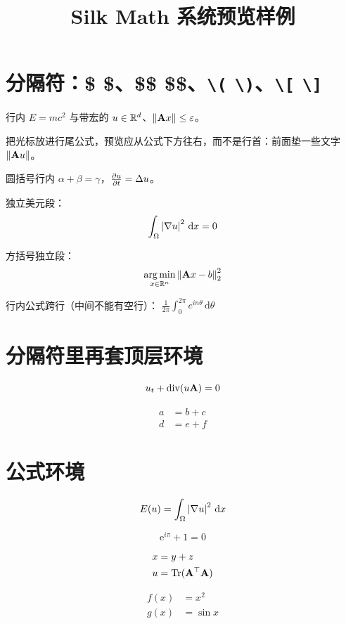 \documentclass{silkmath-fixture}
\title{Silk Math 系统预览样例}
\begin{document}
\section{分隔符：\$ \$、\$\$ \$\$、\verb|\(| \verb|\)|、\verb|\[| \verb|\]|}

行内 $E=mc^2$ 与带宏的 $u\in\mathbb{R}^d$、$\left\lVert \mathbf{A} x \right\rVert\le\varepsilon$。

把光标放进行尾公式，预览应从公式下方往右，而不是行首：前面垫一些文字 $\left\lVert \mathbf{A} u \right\rVert$。

圆括号行内 \(\alpha+\beta=\gamma\)，\(\frac{\partial u}{\partial t}=\Delta u\)。

独立美元段：
$$
\int_\Omega \left\lvert \nabla u \right\rvert^2\,\mathrm{d}x = 0
$$

方括号独立段：
\[
\operatorname*{arg\,min}_{x\in\mathbb{R}^n} \left\lVert \mathbf{A} x-b \right\rVert_2^2
\]

行内公式跨行（中间不能有空行）：
$\frac{1}{2\pi}
\int_0^{2\pi} e^{in\theta}\,\mathrm{d}\theta$

\section{分隔符里再套顶层环境}

$$
\begin{equation}
  u_t + \operatorname{div}(u\A) = 0
\end{equation}
$$

\[
\begin{align}
  a &= b+c \\
  d &= e+f
\end{align}
\]

\section{公式环境}

\begin{equation}
  \label{eq:energy}
  E(u)=\int_\Omega \left\lvert \nabla u \right\rvert^2\,\mathrm{d}x
\end{equation}

\begin{equation*}
  \mathrm{e}^{i\pi}+1=0
\end{equation*}

\begin{align}
  x &= y+z \label{eq:a} \\
  u &= \operatorname{Tr}(\mathbf{A}^\top\mathbf{A})
\end{align}

\begin{align*}
  f(x) &= x^2 \\
  g(x) &= \sin x
\end{align*}
\end{document}
